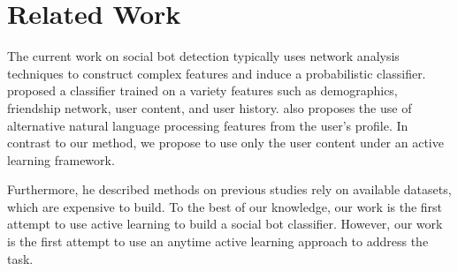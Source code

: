  
\section{Related Work}

The current work on social bot detection typically uses network analysis techniques to construct complex features and induce a probabilistic classifier. \cite{lee:aaai11} proposed a classifier trained on a variety features such as demographics, friendship network, user content, and user history.  \cite{sriram:sigir10} also proposes the use of alternative natural language processing features from the user's profile. In contrast to our method, we propose to use only the user content under an active learning framework.

Furthermore, he described methods on previous studies rely on available datasets, which are expensive to build. To the best of our knowledge, our work is the first attempt to use active learning to build a social bot classifier. However, our work is the first attempt to use an anytime active learning approach to address the task. 
